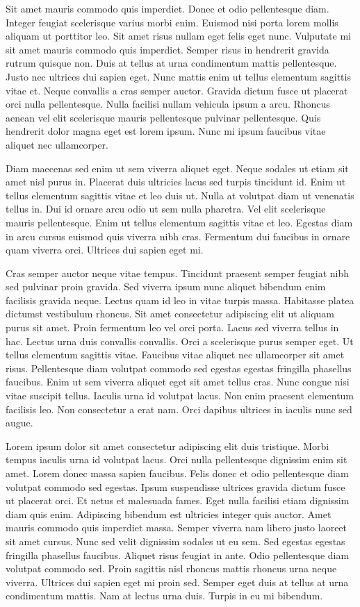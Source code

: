 \documentclass[11pt,a4paper]{article}
\begin{document}
Sit amet mauris commodo quis imperdiet. Donec et odio pellentesque diam. Integer feugiat scelerisque varius morbi enim. Euismod nisi porta lorem mollis aliquam ut porttitor leo. Sit amet risus nullam eget felis eget nunc. Vulputate mi sit amet mauris commodo quis imperdiet. Semper risus in hendrerit gravida rutrum quisque non. Duis at tellus at urna condimentum mattis pellentesque. Justo nec ultrices dui sapien eget. Nunc mattis enim ut tellus elementum sagittis vitae et. Neque convallis a cras semper auctor. Gravida dictum fusce ut placerat orci nulla pellentesque. Nulla facilisi nullam vehicula ipsum a arcu. Rhoncus aenean vel elit scelerisque mauris pellentesque pulvinar pellentesque. Quis hendrerit dolor magna eget est lorem ipsum. Nunc mi ipsum faucibus vitae aliquet nec ullamcorper.

Diam maecenas sed enim ut sem viverra aliquet eget. Neque sodales ut etiam sit amet nisl purus in. Placerat duis ultricies lacus sed turpis tincidunt id. Enim ut tellus elementum sagittis vitae et leo duis ut. Nulla at volutpat diam ut venenatis tellus in. Dui id ornare arcu odio ut sem nulla pharetra. Vel elit scelerisque mauris pellentesque. Enim ut tellus elementum sagittis vitae et leo. Egestas diam in arcu cursus euismod quis viverra nibh cras. Fermentum dui faucibus in ornare quam viverra orci. Ultrices dui sapien eget mi.

Cras semper auctor neque vitae tempus. Tincidunt praesent semper feugiat nibh sed pulvinar proin gravida. Sed viverra ipsum nunc aliquet bibendum enim facilisis gravida neque. Lectus quam id leo in vitae turpis massa. Habitasse platea dictumst vestibulum rhoncus. Sit amet consectetur adipiscing elit ut aliquam purus sit amet. Proin fermentum leo vel orci porta. Lacus sed viverra tellus in hac. Lectus urna duis convallis convallis. Orci a scelerisque purus semper eget. Ut tellus elementum sagittis vitae. Faucibus vitae aliquet nec ullamcorper sit amet risus. Pellentesque diam volutpat commodo sed egestas egestas fringilla phasellus faucibus. Enim ut sem viverra aliquet eget sit amet tellus cras. Nunc congue nisi vitae suscipit tellus. Iaculis urna id volutpat lacus. Non enim praesent elementum facilisis leo. Non consectetur a erat nam. Orci dapibus ultrices in iaculis nunc sed augue.

Lorem ipsum dolor sit amet consectetur adipiscing elit duis tristique. Morbi tempus iaculis urna id volutpat lacus. Orci nulla pellentesque dignissim enim sit amet. Lorem donec massa sapien faucibus. Felis donec et odio pellentesque diam volutpat commodo sed egestas. Ipsum suspendisse ultrices gravida dictum fusce ut placerat orci. Et netus et malesuada fames. Eget nulla facilisi etiam dignissim diam quis enim. Adipiscing bibendum est ultricies integer quis auctor. Amet mauris commodo quis imperdiet massa. Semper viverra nam libero justo laoreet sit amet cursus. Nunc sed velit dignissim sodales ut eu sem. Sed egestas egestas fringilla phasellus faucibus. Aliquet risus feugiat in ante. Odio pellentesque diam volutpat commodo sed. Proin sagittis nisl rhoncus mattis rhoncus urna neque viverra. Ultrices dui sapien eget mi proin sed. Semper eget duis at tellus at urna condimentum mattis. Nam at lectus urna duis. Turpis in eu mi bibendum.
\end{document}
